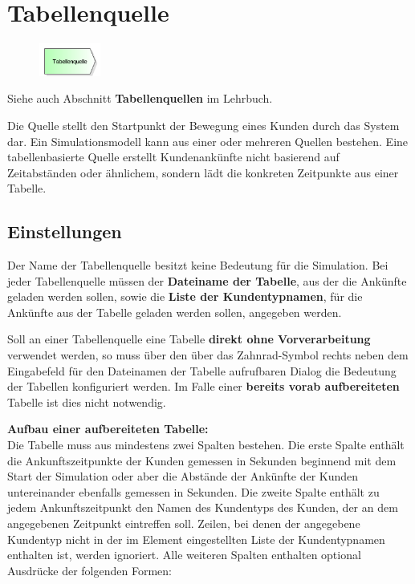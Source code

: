 \section{Tabellenquelle}
\label{ref:ModelElementSourceTable}

\begin{figure}
\vspace{-22pt}
\includegraphics[width=2cm]{imageModelElementSourceTable.png}
\vspace{-22pt}
\end{figure}

Siehe auch Abschnitt \textbf{Tabellenquellen} im Lehrbuch.

Die Quelle stellt den Startpunkt der Bewegung eines Kunden durch das System dar.
Ein Simulationsmodell kann aus einer oder mehreren Quellen bestehen.
Eine tabellenbasierte Quelle erstellt Kundenankünfte nicht basierend auf
Zeitabständen oder ähnlichem, sondern lädt die konkreten Zeitpunkte aus einer
Tabelle.

\subsection*{Einstellungen}

Der Name der Tabellenquelle besitzt keine Bedeutung für die Simulation.
Bei jeder Tabellenquelle müssen der \textbf{Dateiname der Tabelle}, aus
der die Ankünfte geladen werden sollen, sowie die \textbf{Liste der Kundentypnamen},
für die Ankünfte aus der Tabelle geladen werden sollen, angegeben werden.

Soll an einer Tabellenquelle eine Tabelle \textbf{direkt ohne Vorverarbeitung}
verwendet werden, so muss über den über das Zahnrad-Symbol rechts neben dem Eingabefeld
für den Dateinamen der Tabelle aufrufbaren Dialog die Bedeutung der Tabellen konfiguriert werden.
Im Falle einer \textbf{bereits vorab aufbereiteten} Tabelle ist dies nicht notwendig.

\textbf{Aufbau einer aufbereiteten Tabelle:}~\\
Die Tabelle muss aus mindestens zwei Spalten bestehen. Die erste Spalte enthält die Ankunftszeitpunkte
der Kunden gemessen in Sekunden beginnend mit dem Start der Simulation oder aber die Abstände
der Ankünfte der Kunden untereinander ebenfalls gemessen in Sekunden. Die zweite Spalte
enthält zu jedem Ankunftszeitpunkt den Namen des Kundentyps des Kunden, der an dem
angegebenen Zeitpunkt eintreffen soll. Zeilen, bei denen der angegebene Kundentyp
nicht in der im Element eingestellten Liste der Kundentypnamen enthalten ist, werden ignoriert.
Alle weiteren Spalten enthalten optional Ausdrücke der folgenden Formen:


